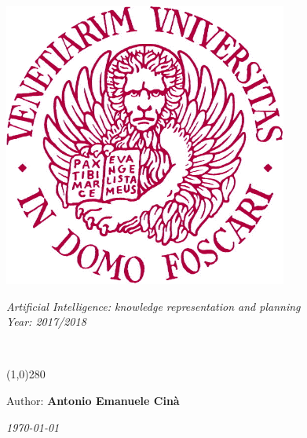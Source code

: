 \newcommand{\image}[3]{ %
	\begin{figure}[h!]
		\centering
		\texttt{[image: \#1]} 
		\caption{#2}
	\end{figure}
	\FloatBarrier
}

\newcommand{\R}{{\rm I\!R}}

\newcommand{\imageLabel}[4]{ %
	\begin{figure}[h!]
		\centering
		\texttt{[image: \#1]} 
		\caption{#2}
		\label{fig:#4}
	\end{figure}
	\FloatBarrier
}
\newcommand{\Z}{\mathbb{Z}}

\begin{titlepage}
	\begin{center}
		\includegraphics[width=0.7\textwidth]{unive}
		
		\vspace*{1cm}
		\LARGE
		\textit{Artificial Intelligence: knowledge representation and planning\\ \center Year: 2017/2018}
		
		\vspace{0.5cm}
		\Huge
		\textbf{\titolo}\\
		\LARGE {\nome}
		
		\line(1,0){280}
		
		\vspace{0.5cm}
		\large
		

		\Large
		\Large Author: \textbf{Antonio Emanuele Cinà} \\
		\vspace{0.5cm}

		\textit{\today }
		
		\vfill
		
	\end{center}
\end{titlepage}

